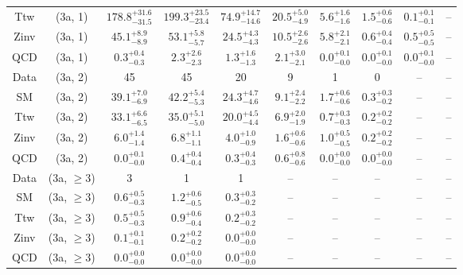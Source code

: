 \begin{table}[h!]
{\begin{tabular}{cccccccccc}
	Ttw & (3a, 1) & $178.8^{+ 31.6 }_{- 31.5 }$ & $199.3^{+ 23.5 }_{- 23.4 }$ & $74.9^{+ 14.7 }_{- 14.6 }$ & $20.5^{+ 5.0 }_{- 4.9 }$ & $5.6^{+ 1.6 }_{- 1.6 }$ & $1.5^{+ 0.6 }_{- 0.6 }$ & $0.1^{+ 0.1 }_{- 0.1 }$ & -- \\[0.5ex] 
	Zinv & (3a, 1) & $45.1^{+ 8.9 }_{- 8.9 }$ & $53.1^{+ 5.8 }_{- 5.7 }$ & $24.5^{+ 4.3 }_{- 4.3 }$ & $10.5^{+ 2.6 }_{- 2.6 }$ & $5.8^{+ 2.1 }_{- 2.1 }$ & $0.6^{+ 0.4 }_{- 0.4 }$ & $0.5^{+ 0.5 }_{- 0.5 }$ & -- \\[0.5ex] 
	QCD & (3a, 1) & $0.3^{+ 0.4 }_{- 0.3 }$ & $2.3^{+ 2.6 }_{- 2.3 }$ & $1.3^{+ 1.6 }_{- 1.3 }$ & $2.1^{+ 3.0 }_{- 2.1 }$ & $0.0^{+ 0.1 }_{- 0.0 }$ & $0.0^{+ 0.1 }_{- 0.0 }$ & $0.0^{+ 0.1 }_{- 0.0 }$ & -- \\[0.5ex] 
	Data & (3a, 2) & 45 & 45 & 20 & 9 & 1 & 0 & -- & -- \\[0.5ex] 
	SM & (3a, 2) & $39.1^{+ 7.0 }_{- 6.9 }$ & $42.2^{+ 5.4 }_{- 5.3 }$ & $24.3^{+ 4.7 }_{- 4.6 }$ & $9.1^{+ 2.4 }_{- 2.2 }$ & $1.7^{+ 0.6 }_{- 0.6 }$ & $0.3^{+ 0.3 }_{- 0.2 }$ & -- & -- \\[0.5ex] 
	Ttw & (3a, 2) & $33.1^{+ 6.6 }_{- 6.5 }$ & $35.0^{+ 5.1 }_{- 5.0 }$ & $20.0^{+ 4.5 }_{- 4.4 }$ & $6.9^{+ 2.0 }_{- 1.9 }$ & $0.7^{+ 0.3 }_{- 0.3 }$ & $0.2^{+ 0.2 }_{- 0.2 }$ & -- & -- \\[0.5ex] 
	Zinv & (3a, 2) & $6.0^{+ 1.4 }_{- 1.4 }$ & $6.8^{+ 1.1 }_{- 1.1 }$ & $4.0^{+ 1.0 }_{- 0.9 }$ & $1.6^{+ 0.6 }_{- 0.6 }$ & $1.0^{+ 0.5 }_{- 0.5 }$ & $0.2^{+ 0.2 }_{- 0.2 }$ & -- & -- \\[0.5ex] 
	QCD & (3a, 2) & $0.0^{+ 0.1 }_{- 0.0 }$ & $0.4^{+ 0.4 }_{- 0.4 }$ & $0.3^{+ 0.4 }_{- 0.3 }$ & $0.6^{+ 0.8 }_{- 0.6 }$ & $0.0^{+ 0.0 }_{- 0.0 }$ & $0.0^{+ 0.0 }_{- 0.0 }$ & -- & -- \\[0.5ex] 
	Data & (3a, $\ge3$) & 3 & 1 & 1 & -- & -- & -- & -- & -- \\[0.5ex] 
	SM & (3a, $\ge3$) & $0.6^{+ 0.5 }_{- 0.3 }$ & $1.2^{+ 0.6 }_{- 0.5 }$ & $0.3^{+ 0.3 }_{- 0.2 }$ & -- & -- & -- & -- & -- \\[0.5ex] 
	Ttw & (3a, $\ge3$) & $0.5^{+ 0.5 }_{- 0.3 }$ & $0.9^{+ 0.6 }_{- 0.4 }$ & $0.2^{+ 0.3 }_{- 0.2 }$ & -- & -- & -- & -- & -- \\[0.5ex] 
	Zinv & (3a, $\ge3$) & $0.1^{+ 0.1 }_{- 0.1 }$ & $0.2^{+ 0.2 }_{- 0.2 }$ & $0.0^{+ 0.0 }_{- 0.0 }$ & -- & -- & -- & -- & -- \\[0.5ex] 
	QCD & (3a, $\ge3$) & $0.0^{+ 0.0 }_{- 0.0 }$ & $0.0^{+ 0.0 }_{- 0.0 }$ & $0.0^{+ 0.0 }_{- 0.0 }$ & -- & -- & -- & -- & -- \\[0.5ex] 

\end{tabular}}
\end{table}
